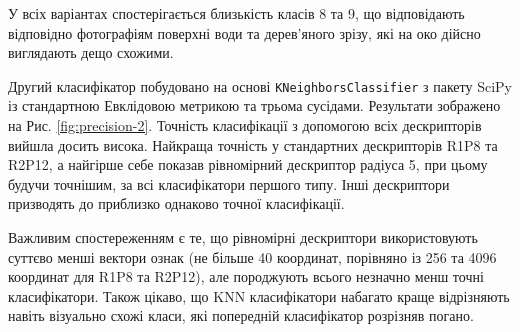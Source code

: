 У всіх варіантах спостерігається близькість класів 8 та 9, що відповідають відповідно фотографіям поверхні води та дерев'яного зрізу,
які на око дійсно виглядають дещо схожими. 

Другий класифікатор побудовано на основі \verb|KNeighborsClassifier| з пакету SciPy із стандартною Евклідовою метрикою та трьома сусідами.
Результати зображено на Рис. \ref{fig:precision-2}. 
Точність класифікації з допомогою всіх дескрипторів вийшла досить висока.
Найкраща точність у стандартних дескрипторів R1P8 та R2P12, а
найгірше себе показав рівномірний дескриптор радіуса 5, при цьому будучи точнішим, за всі класифікатори першого типу.
Інші дескриптори призводять до приблизко однаково точної класифікації.

Важливим спостереженням є те, що рівномірні дескриптори використовують суттєво менші вектори ознак 
(не більше 40 координат, порівняно із 256 та 4096 координат для R1P8 та R2P12), 
але породжують всього незначно менш точні класифікатори.
Також цікаво, що KNN класифікатори набагато краще відрізняють навіть візуально схожі класи, які попередній класифікатор розрізняв погано.

